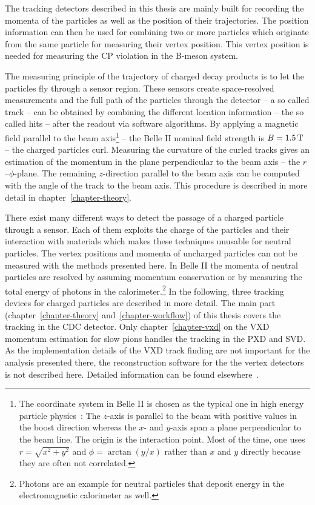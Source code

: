 The tracking detectors described in this thesis are mainly built for recording the momenta of the particles as well as the position of their trajectories. The position information can then be used for combining two or more particles which originate from the same particle for measuring their vertex position. This vertex position is needed for measuring the CP violation in the B-meson system. %

The measuring principle of the trajectory of charged decay products is to let the particles fly through a sensor region. These sensors create space-resolved measurements and the full path of the particles through the detector -- a so called track -- can be obtained by combining the different location information -- the so called hits -- after the readout via software algorithms. By applying a magnetic field parallel to the beam axis\footnote{The coordinate system in Belle II is chosen as the typical one in high energy particle physics~\cite{coordinate}: The $z$-axis is parallel to the beam with positive values in the boost direction whereas the $x$- and $y$-axis span a plane perpendicular to the beam line. The origin is the interaction point. Most of the time, one uses $r = \sqrt{x^2 + y^2}$ and $\phi = \arctan(y/x)$ rather than $x$ and $y$ directly because they are often not correlated.} -- the Belle II nominal field strength is $B = \unit[1.5]{T}$ -- the charged particles curl. Measuring the curvature of the curled tracks gives an estimation of the momentum in the plane perpendicular to the beam axis -- the $r$--$\phi$-plane. The remaining $z$-direction parallel to the beam axis can be computed with the angle of the track to the beam axis. This procedure is described in more detail in chapter~\ref{chapter-theory}.

There exist many different ways to detect the passage of a charged particle through a sensor. Each of them exploits the charge of the particles and their interaction with materials which makes these techniques unusable for neutral particles. The vertex positions and momenta of uncharged particles can not be measured with the methods presented here. In Belle II the momenta of neutral particles are resolved by assuming momentum conservation or by measuring the total energy of photons in the calorimeter.\footnote{Photons are an example for neutral particles that deposit energy in the electromagnetic calorimeter as well.} In the following, three tracking devices for charged particles are described in more detail. The main part (chapter~\ref{chapter-theory} and~\ref{chapter-workflow}) of this thesis covers the tracking in the CDC detector. Only chapter~\ref{chapter-vxd} on the VXD momentum estimation for slow pions handles the tracking in the PXD and SVD.  As the implementation details of the VXD track finding are not important for the analysis presented there, the reconstruction software for the the vertex detectors is not described here. Detailed information can be found elsewhere~\cite{jakob}.

